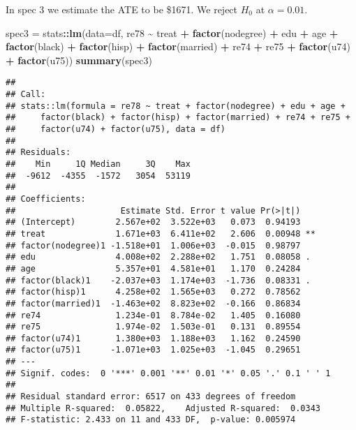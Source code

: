 \documentclass[
]{article}
\newenvironment{Shaded}{\begin{snugshade}}{\end{snugshade}}
\newcommand{\AttributeTok}[1]{\textcolor[rgb]{0.13,0.29,0.53}{#1}}
\newcommand{\FunctionTok}[1]{\textcolor[rgb]{0.13,0.29,0.53}{\textbf{#1}}}
\newcommand{\NormalTok}[1]{#1}
\newcommand{\OtherTok}[1]{\textcolor[rgb]{0.56,0.35,0.01}{#1}}
\newcommand{\SpecialCharTok}[1]{\textcolor[rgb]{0.81,0.36,0.00}{\textbf{#1}}}
\begin{document}
In spec 3 we estimate the ATE to be \$1671. We reject \(H_0\) at
\(\alpha = 0.01\).

\begin{Shaded}
\begin{Highlighting}[]
\NormalTok{spec3 }\OtherTok{=}\NormalTok{ stats}\SpecialCharTok{::}\FunctionTok{lm}\NormalTok{(}\AttributeTok{data=}\NormalTok{df, re78 }\SpecialCharTok{\textasciitilde{}}\NormalTok{ treat }\SpecialCharTok{+} \FunctionTok{factor}\NormalTok{(nodegree) }\SpecialCharTok{+}\NormalTok{ edu }\SpecialCharTok{+}\NormalTok{ age }
                  \SpecialCharTok{+} \FunctionTok{factor}\NormalTok{(black) }\SpecialCharTok{+} \FunctionTok{factor}\NormalTok{(hisp) }\SpecialCharTok{+} \FunctionTok{factor}\NormalTok{(married) }
                  \SpecialCharTok{+}\NormalTok{ re74 }\SpecialCharTok{+}\NormalTok{ re75 }\SpecialCharTok{+} \FunctionTok{factor}\NormalTok{(u74) }\SpecialCharTok{+} \FunctionTok{factor}\NormalTok{(u75))}
\FunctionTok{summary}\NormalTok{(spec3)}
\end{Highlighting}
\end{Shaded}

\begin{verbatim}
## 
## Call:
## stats::lm(formula = re78 ~ treat + factor(nodegree) + edu + age + 
##     factor(black) + factor(hisp) + factor(married) + re74 + re75 + 
##     factor(u74) + factor(u75), data = df)
## 
## Residuals:
##    Min     1Q Median     3Q    Max 
##  -9612  -4355  -1572   3054  53119 
## 
## Coefficients:
##                     Estimate Std. Error t value Pr(>|t|)   
## (Intercept)        2.567e+02  3.522e+03   0.073  0.94193   
## treat              1.671e+03  6.411e+02   2.606  0.00948 **
## factor(nodegree)1 -1.518e+01  1.006e+03  -0.015  0.98797   
## edu                4.008e+02  2.288e+02   1.751  0.08058 . 
## age                5.357e+01  4.581e+01   1.170  0.24284   
## factor(black)1    -2.037e+03  1.174e+03  -1.736  0.08331 . 
## factor(hisp)1      4.258e+02  1.565e+03   0.272  0.78562   
## factor(married)1  -1.463e+02  8.823e+02  -0.166  0.86834   
## re74               1.234e-01  8.784e-02   1.405  0.16080   
## re75               1.974e-02  1.503e-01   0.131  0.89554   
## factor(u74)1       1.380e+03  1.188e+03   1.162  0.24590   
## factor(u75)1      -1.071e+03  1.025e+03  -1.045  0.29651   
## ---
## Signif. codes:  0 '***' 0.001 '**' 0.01 '*' 0.05 '.' 0.1 ' ' 1
## 
## Residual standard error: 6517 on 433 degrees of freedom
## Multiple R-squared:  0.05822,    Adjusted R-squared:  0.0343 
## F-statistic: 2.433 on 11 and 433 DF,  p-value: 0.005974
\end{verbatim}
\end{document}
